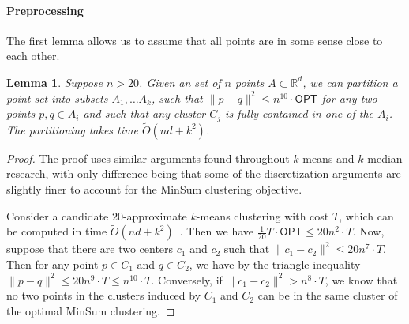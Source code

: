 \documentclass[11pt]{article}
\newtheorem{lemma}[theorem]{Lemma}
\def \OPT    {\mdef{\mathsf{OPT}}}
\newcommand{\mdef}[1]{{\ensuremath{#1}}\xspace}  %
\begin{document}

\paragraph{Preprocessing}

The first lemma allows us to assume that all points are in some sense close to each other.
\begin{lemma}
\label{lem:preprocess}
    Suppose $n>20$.
    Given an set of $n$ points $A\subset \mathbb{R}^d$, we can partition a point set into subsets $A_1,\ldots A_k$, such that $\|p-q\|^2 \leq n^{10}\cdot \OPT$ for any two points $p,q\in A_i$ and such that any cluster $C_j$ is fully contained in one of the $A_i$. The partitioning takes time $\tilde{O}(nd+k^2)$.
\end{lemma}
\begin{proof}
The proof uses similar arguments found throughout $k$-means and $k$-median research, with only difference being that some of the discretization arguments are slightly finer to account for the MinSum clustering objective.

Consider a candidate $20$-approximate $k$-means clustering with cost $T$, which can be computed in time $\tilde{O}(nd+k^2)$~\cite{DraganovSS24}. Then we have $\frac{1}{20}T\cdot \OPT\leq 20 n^2 \cdot T$. Now, suppose that there are two centers $c_1$ and $c_2$ such that $\|c_1-c_2\|^2 \leq 20 n^{7} \cdot T$. Then for any point $p\in C_1$ and $q\in C_2$, we have by the triangle inequality $\|p-q\|^2 \leq 20n^{9}\cdot T\leq n^{10}\cdot T$. Conversely, if $\|c_1-c_2\|^2 > n^{8} \cdot T$, we know that no two points in the clusters induced by $C_1$ and $C_2$ can be in the same cluster of the optimal MinSum clustering. 
\end{proof}
\end{document}
